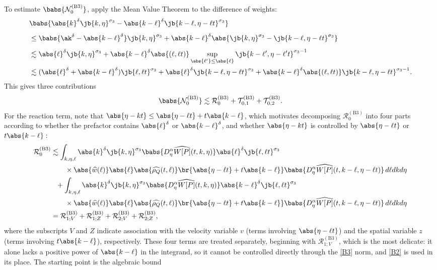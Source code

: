To estimate $\babs{\mathcal{N}_0^{\mathrm{(B3)}}}$, apply the Mean Value Theorem to the difference of weights:
\begin{align*}
&\babs{\abs{k}^\delta\jb{k,\eta}^{\sigma_3}-\abs{k-\ell }^\delta\jb{k-\ell ,\eta-\ell t}^{\sigma_3}}\\
&\leq \babs{\ak^\delta-\abs{k-\ell }^\delta}\jb{k,\eta}^{\sigma_3}+\abs{k-\ell }^\delta\abs{\jb{k,\eta}^{\sigma_3}-\jb{k-\ell ,\eta-\ell t}^{\sigma_3}}\vphantom{\int}\\
&\lesssim\abs{\ell }^\delta\jb{k,\eta}^{\sigma_3}+\abs{k-\ell }^\delta\abs{(\ell ,\ell t)}\sup_{\abs{\ell '}\leq \abs{\ell }}\jb{k-\ell ',\eta-\ell 't}^{\sigma_3-1}\\
&\lesssim(\abs{\ell }^\delta+\abs{k-\ell }^\delta)\jb{\ell ,\ell t}^{\sigma_3}+\abs{\ell }^\delta\jb{k-\ell ,\eta-\ell t}^{\sigma_3}+\abs{k-\ell }^\delta\abs{(\ell ,\ell t)}\jb{k-\ell ,\eta-\ell t}^{\sigma_3-1}.
\end{align*}
This gives three contributions \[\babs{\mathcal{N}_0^{\mathrm{(B3)}}}\lesssim \mathcal{R}_0^{\mathrm{(B3)}}+\mathcal{T}_{0,1}^{\mathrm{(B3)}}+\mathcal{T}_{0,2}^{\mathrm{(B3)}}.\] For the reaction term, note that $\abs{\eta-kt}\leq \abs{\eta-\ell t}+t\abs{k-\ell }$, which motivates decomposing $\mathcal{R}_0^{\mathrm{(B3)}}$ into four parts according to whether the prefactor contains $\abs{\ell}^\delta$ or $\abs{k-\ell}^{\delta}$, and whether $\abs{\eta-kt}$ is controlled by $\abs{\eta-\ell t}$ or $t\abs{k-\ell}:$
\begin{align*}
\mathcal{R}_0^{\mathrm{(B3)}}&\lesssim\int_{k,\eta,\ell }\abs{k}^\delta\jb{k,\eta}^{\sigma_3}\babs{D_\eta^\alpha \widehat{W[P]}(t,k,\eta)}\abs{\ell }^\delta\jb{\ell ,\ell t}^{\sigma_3}\\
&\hspace{0.7cm}\times\abs{\widehat{w}(\ell )}\abs{\ell }\abs{\widehat{\rho_Q}(t,\ell )}\br{\abs{\eta-\ell t}+t\abs{k-\ell }}\babs{D_\eta^\alpha\widehat{W[P]}(t,k-\ell ,\eta-\ell t)}\,d\ell dkd\eta\\
&\hspace{0.25cm}+\int_{k,\eta,\ell }\abs{k}^\delta\jb{k,\eta}^{\sigma_3}\babs{D_\eta^\alpha \widehat{W[P]}(t,k,\eta)}\abs{k-\ell }^\delta\jb{\ell ,\ell t}^{\sigma_3}\\
&\hspace{0.7cm}\times\abs{\widehat{w}(\ell )}\abs{\ell }\abs{\widehat{\rho_Q}(t,\ell )}\br{\abs{\eta-\ell t}+t\abs{k-\ell }}\babs{D_\eta^\alpha\widehat{W[P]}(t,k-\ell ,\eta-\ell t)}\,d\ell dkd\eta\\
&=\mathcal{R}_{1;V}^{\mathrm{(B3)}}+\mathcal{R}_{1;Z}^{\mathrm{(B3)}}+\mathcal{R}_{2;V}^{\mathrm{(B3)}}+\mathcal{R}_{2;Z}^{\mathrm{(B3)}},
\end{align*}where the subscripts $V$ and $Z$ indicate association with the velocity variable $v$ (terms involving $\abs{\eta-\ell t}$) and the spatial variable $z$ (terms involving $t\abs{k-\ell}$), respectively. These four terms are treated separately, beginning with $\mathcal{R}_{1;V}^{\mathrm{(B3)}}$, which is the most delicate: it alone lacks a positive power of $\abs{k-\ell}$ in the integrand, so it cannot be controlled directly through the \eqref{B3} norm, and \eqref{B2} is used in its place. The starting point is the algebraic bound
